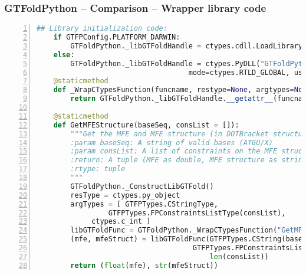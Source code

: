 \documentclass[usenames,svgnames,dvipsnames,11pt]{beamer}
\begin{document}
\begin{frame}[fragile]
\frametitle{GTFoldPython -- Comparison -- Wrapper library code}

\begin{lstlisting}[language=Python,basicstyle=\tiny\ttfamily,keywordstyle=\bfseries\color{green!40!black},
                   commentstyle=\itshape\color{purple!40!black},identifierstyle=\color{blue!63!green},
                   stringstyle=\color{orange},frame=none,keepspaces=true,numbers=left,xleftmargin=0.28cm]
    ## Library initialization code: 
    if GTFPConfig.PLATFORM_DARWIN:
        GTFoldPython._libGTFoldHandle = ctypes.cdll.LoadLibrary("GTFoldPython.dylib")
    else:
        GTFoldPython._libGTFoldHandle = ctypes.PyDLL("GTFoldPython.so", 
	                                mode=ctypes.RTLD_GLOBAL, use_errno=True)
    @staticmethod
    def _WrapCTypesFunction(funcname, restype=None, argtypes=None):
        return GTFoldPython._libGTFoldHandle.__getattr__(funcname)
        
    @staticmethod
    def GetMFEStructure(baseSeq, consList = []):
        """Get the MFE and MFE structure (in DOTBracket structure notation)
        :param baseSeq: A string of valid bases (ATGU/X) 
        :param consList: A list of constraints on the MFE structure
        :return: A tuple (MFE as double, MFE structure as string in DOTBracket notation)
        :rtype: tuple
        """
        GTFoldPython._ConstructLibGTFold()
        resType = ctypes.py_object
        argTypes = [ GTFPTypes.CStringType, 
	             GTFPTypes.FPConstraintsListType(consList), 
		     ctypes.c_int ]
        libGTFoldFunc = GTFoldPython._WrapCTypesFunction("GetMFEStructure", resType, argTypes)
        (mfe, mfeStruct) = libGTFoldFunc(GTFPTypes.CString(baseSeq), 
	                                 GTFPTypes.FPConstraintsList(consList), 
                                         len(consList))
        return (float(mfe), str(mfeStruct))
\end{lstlisting}

\end{frame}
\end{document}
